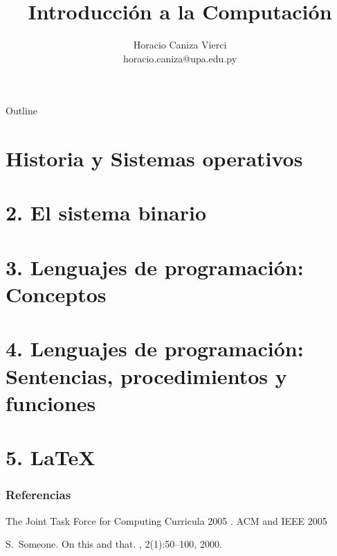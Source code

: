 \documentclass[notes]{beamer}       %
\title{Introducci\'on a la Computaci\'on}
\author{Horacio Caniza Vierci\\horacio.caniza@upa.edu.py}
\begin{document}
\begin{frame}
    \titlepage
\end{frame}

\begin{frame}{Outline}
    \tableofcontents
\end{frame}


\section{Historia y Sistemas operativos}
%

\section{2. El sistema binario}
%

\section{3. Lenguajes de programaci\'on: Conceptos}


\section{4. Lenguajes de programaci\'on: Sentencias, procedimientos y funciones}

\section{5. \LaTeX}
%


\begin{frame}[allowframebreaks]
  \frametitle<presentation>{Referencias}
    
  \begin{thebibliography}{10}
    
  \beamertemplatebookbibitems

      The Joint Task Force for Computing Curricula 2005
    .
    \newblock ACM and IEEE 2005
 
    
  \beamertemplatearticlebibitems

    S.~Someone.
    \newblock On this and that.
    , 2(1):50--100,
    2000.
  \end{thebibliography}
\end{frame}
\end{document}
